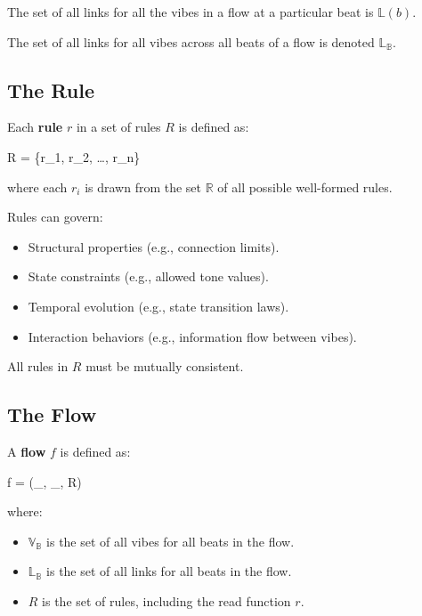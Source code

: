\documentclass{article}
\let\oldequation\equation
\let\endoldequation\endequation
\renewenvironment{equation}{%
    \noindent\vspace{-\parskip}\vspace{-\baselineskip}%
    \oldequation
}{%
    \endoldequation
    \noindent\vspace{-\parskip}\vspace{-\baselineskip}%
}
\theoremstyle{definition}
\theoremstyle{axiom}
\theoremstyle{theorem}
\theoremstyle{lemma}
\theoremstyle{proposition}
\begin{document}
The set of all links for all the vibes in a flow at a particular beat is $\mathbb{L}(b)$.

The set of all links for all vibes across all beats of a flow is denoted $\mathbb{L}_\mathbb{B}$.

\subsection{The Rule}

Each \textbf{rule} $r$ in a set of rules $R$ is defined as:

\begin{equation}
    R = \{r_1, r_2, \ldots, r_n\}
\end{equation}

where each $r_i$ is drawn from the set $\mathbb{R}$ of all possible well-formed rules.

Rules can govern:

\begin{itemize}
    \item Structural properties (e.g., connection limits).
    \item State constraints (e.g., allowed tone values).
    \item Temporal evolution (e.g., state transition laws).
    \item Interaction behaviors (e.g., information flow between vibes).
\end{itemize}

All rules in $R$ must be mutually consistent.

\subsection{The Flow}

A \textbf{flow} $f$ is defined as:

\begin{equation}
    f = (_, _, R)
\end{equation}

where:

\begin{itemize}
    \item $\mathbb{V}_\mathbb{B}$ is the set of all vibes for all beats in the flow.
    \item $\mathbb{L}_\mathbb{B}$ is the set of all links for all beats in the flow.
    \item $R$ is the set of rules, including the read function $r$.
\end{itemize}
\end{document}
